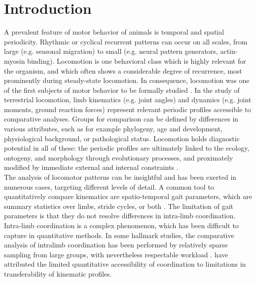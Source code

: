 \documentclass[10pt, a4paper]{article}
\begin{document}
\section*{Introduction}
\begin{linenumbers}[1]
A prevalent feature of motor behavior of animals is temporal and spatial periodicity. 
Rhythmic or cyclical recurrent patterns can occur on all scales, from large (e.g. seasonal migration) to small (e.g. neural pattern generators, actin-myosin binding). 
Locomotion is one behavioral class which is highly relevant for the organism, and which often shows a considerable degree of recurrence, most prominently during steady-state locomotion. %
In consequence, locomotion was one of the first subjects of motor behavior to be formally studied \citep{Marey1878,Muybridge1893,Braune1904,Bernstein1927a,Bernstein1927b}. 
In the study of terrestrial locomotion, limb kinematics (e.g. joint angles) and dynamics (e.g. joint moments, ground reaction forces) represent relevant periodic profiles accessible to comparative analyses. 
Groups for comparison can be defined by differences in various attributes, such as for example phylogeny, age and development, physiological background, or pathological status. 
Locomotion holds diagnostic potential in all of these: the periodic profiles are ultimately linked to the ecology, ontogeny, and morphology through evolutionary processes, and proximately modified by immediate external and internal constraints \citep[e.g.][]{Barrett2008,McGibbon2003,Mohling2014,Nyakatura2012,Nyakatura2019,Vanhooydonck2014,VandenHole2018}. 
\\The analysis of locomotor patterns can be insightful and has been exerted in numerous cases, targeting different levels of detail. 
A common tool to quantitatively compare kinematics are spatio-temporal gait parameters, which are summary statistics over limbs, stride cycles, or both \citep[see e.g.][]{Christiansen2002,Biancardi2012}. 
The limitation of gait parameters is that they do not resolve differences in intra-limb coordination. 
Intra-limb coordination is a complex phenomenon, which has been difficult to capture in quantitative methods. 
In some hallmark studies, the comparative analysis of intralimb coordination has been performed by relatively sparse sampling from large groups, with nevertheless respectable workload \citep{Stoessel2012,Fischer2002,Isler2005}. 
\citet{Gatesy2011} have attributed the limited quantitative accessibility of coordination to limitations in transferability of kinematic profiles. 

\end{linenumbers}
\end{document}
